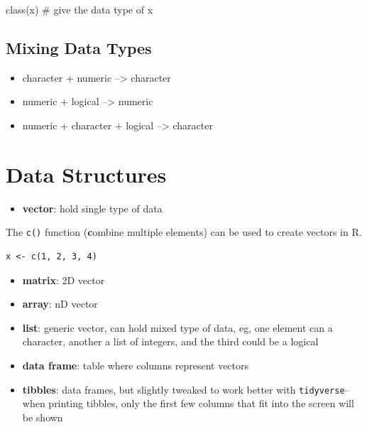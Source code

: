 \documentclass[
  letterpaper,
  DIV=11,
  numbers=noendperiod]{scrreprt}
\newenvironment{Shaded}{\begin{snugshade}}{\end{snugshade}}
\newcommand{\CommentTok}[1]{\textcolor[rgb]{0.37,0.37,0.37}{#1}}
\newcommand{\FunctionTok}[1]{\textcolor[rgb]{0.28,0.35,0.67}{#1}}
\newcommand{\NormalTok}[1]{\textcolor[rgb]{0.00,0.23,0.31}{#1}}
\providecommand{\tightlist}{%
  \setlength{\itemsep}{0pt}\setlength{\parskip}{0pt}}\usepackage{longtable,booktabs,array}
\begin{document}
\begin{Shaded}
\begin{Highlighting}[]
\FunctionTok{class}\NormalTok{(x) }\CommentTok{\# give the data type of x}
\end{Highlighting}
\end{Shaded}

\subsection{Mixing Data Types}\label{mixing-data-types}

\begin{itemize}
\tightlist
\item
  character + numeric --\textgreater{} character
\item
  numeric + logical --\textgreater{} numeric
\item
  numeric + character + logical --\textgreater{} character
\end{itemize}

\section{Data Structures}\label{data-structures}

\begin{itemize}
\tightlist
\item
  \textbf{vector}: hold single type of data
\end{itemize}

\begin{tcolorbox}[enhanced jigsaw, opacityback=0, title=\textcolor{quarto-callout-note-color}{\faInfo}\hspace{0.5em}{Creating Vector}, colback=white, leftrule=.75mm, colbacktitle=quarto-callout-note-color!10!white, bottomrule=.15mm, colframe=quarto-callout-note-color-frame, arc=.35mm, bottomtitle=1mm, coltitle=black, toptitle=1mm, toprule=.15mm, opacitybacktitle=0.6, rightrule=.15mm, titlerule=0mm, breakable, left=2mm]

The \texttt{c()} function (\textbf{c}ombine multiple elements) can be
used to create vectors in R.

\begin{verbatim}
x <- c(1, 2, 3, 4)
\end{verbatim}

\end{tcolorbox}

\begin{itemize}
\tightlist
\item
  \textbf{matrix}: 2D vector
\item
  \textbf{array}: nD vector
\item
  \textbf{list}: generic vector, can hold mixed type of data, eg, one
  element can a character, another a list of integers, and the third
  could be a logical
\item
  \textbf{data frame}: table where columns represent vectors
\item
  \textbf{tibbles}: data frames, but slightly tweaked to work better
  with \texttt{tidyverse}--when printing tibbles, only the first few
  columns that fit into the screen will be shown
\end{itemize}
\end{document}
